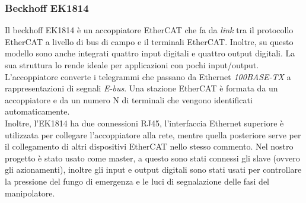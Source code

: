\subsubsection{Beckhoff EK1814}
Il beckhoff EK1814 è un accoppiatore EtherCAT che fa da \textit{link} tra il protocollo EtherCAT a livello di bus di campo e il terminali EtherCAT. Inoltre, su questo modello sono anche integrati quattro input digitali e quattro output digitali. La sua struttura lo rende ideale per applicazioni con pochi input/output. L'accoppiatore converte i telegrammi che passano da Ethernet \textit{100BASE-TX} a rappresentazioni di segnali \textit{E-bus}. Una stazione EtherCAT è formata da un accoppiatore e da un numero N di terminali che vengono identificati automaticamente.
\\Inoltre, l'EK1814 ha due connessioni RJ45, l'interfaccia Ethernet superiore è utilizzata per collegare l'accoppiatore alla rete, mentre quella posteriore serve per il collegamento di altri dispositivi EtherCAT nello stesso commento. Nel nostro progetto è stato usato come master, a questo sono stati connessi gli slave (ovvero gli azionamenti), inoltre gli input e output digitali sono stati usati per controllare la pressione del fungo di emergenza e le luci di segnalazione delle fasi del manipolatore.

